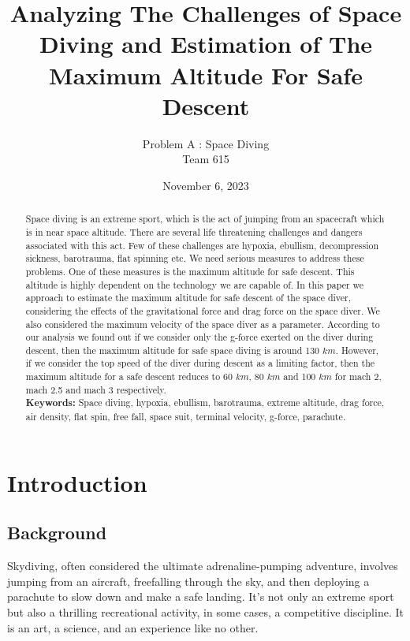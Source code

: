 \documentclass[a4paper, 14pt]{extarticle}
\begin{document}
\title{\textbf{Analyzing The Challenges of Space Diving and Estimation of The Maximum Altitude For Safe Descent}}
\author{Problem A : Space Diving\\Team 615}
\date{November 6, 2023}
\maketitle
\begin{abstract}
Space diving is an extreme sport, which is the act of  jumping from an spacecraft which is in near space altitude. There are several life threatening challenges and dangers associated with this act. Few of these challenges are hypoxia, ebullism, decompression sickness, barotrauma, flat spinning etc. We need serious measures to address these problems. One of these measures is the maximum altitude for safe descent. This altitude is highly dependent on the technology we are capable of. In this paper we approach to estimate the maximum altitude for safe descent of the space diver, considering the effects of the gravitational force and drag force on the space diver. We also considered the maximum velocity of the space diver as a parameter. According to our analysis we found out if we consider only the g-force exerted on the diver during descent, then the maximum altitude for safe space diving is around 130 $km$. However, if we consider the top speed of the diver during descent as a limiting factor, then the maximum altitude for a safe descent reduces to 60 $km$, 80 $km$ and 100 $km$ for mach 2, mach 2.5 and mach 3 respectively.\\
\textbf{Keywords:} Space diving, hypoxia, ebullism, barotrauma, extreme altitude, drag force, air density, flat spin, free fall, space suit, terminal velocity, g-force, parachute.
\end{abstract}
\newpage
\tableofcontents
\newpage
\section{Introduction}
\subsection{Background}
Skydiving, often considered the ultimate adrenaline-pumping adventure, involves jumping from an aircraft,
freefalling through the sky, and then deploying a parachute to slow down and make a safe landing. It's not only an
extreme sport but also a thrilling recreational activity, in some cases, a competitive discipline. It is an art, a
science, and an experience like no other. 
\end{document}
